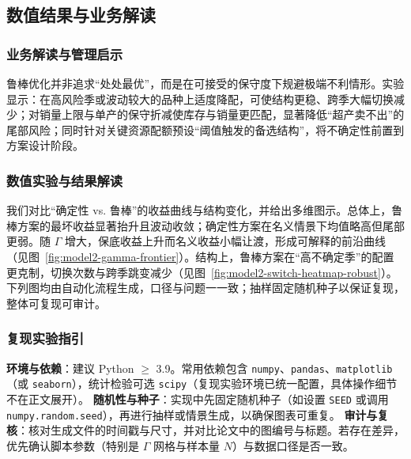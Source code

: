 \subsection{数值结果与业务解读}
\subsubsection{业务解读与管理启示}
鲁棒优化并非追求“处处最优”，而是在可接受的保守度下规避极端不利情形。实验显示：在高风险季或波动较大的品种上适度降配，可使结构更稳、跨季大幅切换减少；对销量上限与单产的保守折减使库存与销量更匹配，显著降低“超产卖不出”的尾部风险；同时针对关键资源配额预设“阈值触发的备选结构”，将不确定性前置到方案设计阶段。

\subsubsection{数值实验与结果解读}
我们对比“确定性 vs. 鲁棒”的收益曲线与结构变化，并给出多维图示。总体上，鲁棒方案的最坏收益显著抬升且波动收敛；确定性方案在名义情景下均值略高但尾部更弱。随 $\Gamma$ 增大，保底收益上升而名义收益小幅让渡，形成可解释的前沿曲线（见图~\ref{fig:model2-gamma-frontier}）。结构上，鲁棒方案在“高不确定季”的配置更克制，切换次数与跨季跳变减少（见图~\ref{fig:model2-switch-heatmap-robust}）。下列图均由自动化流程生成，口径与问题一一致；抽样固定随机种子以保证复现，整体可复现可审计。

\subsubsection{复现实验指引}
{\setlength{\emergencystretch}{3em}\sloppy
\textbf{环境与依赖}：建议 Python $\ge$ 3.9。常用依赖包含 \texttt{numpy}、\texttt{pandas}、\texttt{matplotlib}（或 \texttt{seaborn}），统计检验可选 \texttt{scipy}（复现实验环境已统一配置，具体操作细节不在正文展开）。
\textbf{随机性与种子}：实现中先固定随机种子（如设置 \texttt{SEED} 或调用 \texttt{numpy.random.seed}），再进行抽样或情景生成，以确保图表可重复。
\textbf{审计与复核}：核对生成文件的时间戳与尺寸，并对比论文中的图编号与标题。若存在差异，优先确认脚本参数（特别是 $\Gamma$ 网格与样本量 $N$）与数据口径是否一致。}

